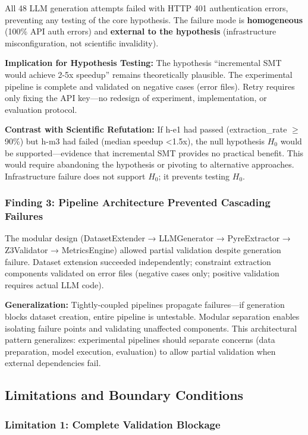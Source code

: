 All 48 LLM generation attempts failed with HTTP 401 authentication errors, preventing any testing of the core hypothesis. The failure mode is \textbf{homogeneous} (100\% API auth errors) and \textbf{external to the hypothesis} (infrastructure misconfiguration, not scientific invalidity).

\textbf{Implication for Hypothesis Testing:} The hypothesis ``incremental SMT would achieve 2-5x speedup'' remains theoretically plausible. The experimental pipeline is complete and validated on negative cases (error files). Retry requires only fixing the API key---no redesign of experiment, implementation, or evaluation protocol.

\textbf{Contrast with Scientific Refutation:} If h-e1 had passed (extraction\_rate $\geq$90\%) but h-m3 had failed (median speedup <1.5x), the null hypothesis $H_0$ would be supported---evidence that incremental SMT provides no practical benefit. This would require abandoning the hypothesis or pivoting to alternative approaches. Infrastructure failure does not support $H_0$; it prevents testing $H_0$.

\subsubsection{Finding 3: Pipeline Architecture Prevented Cascading Failures}

The modular design (DatasetExtender → LLMGenerator → PyreExtractor → Z3Validator → MetricsEngine) allowed partial validation despite generation failure. Dataset extension succeeded independently; constraint extraction components validated on error files (negative cases only; positive validation requires actual LLM code).

\textbf{Generalization:} Tightly-coupled pipelines propagate failures---if generation blocks dataset creation, entire pipeline is untestable. Modular separation enables isolating failure points and validating unaffected components. This architectural pattern generalizes: experimental pipelines should separate concerns (data preparation, model execution, evaluation) to allow partial validation when external dependencies fail.

\subsection{Limitations and Boundary Conditions}

\subsubsection{Limitation 1: Complete Validation Blockage}

